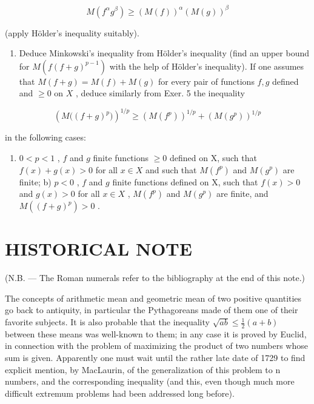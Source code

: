 \[
M (f ^ {\alpha} g ^ {\beta}) \geqslant (M (f)) ^ {\alpha} (M (g)) ^ {\beta}
\]

(apply Hölder's inequality suitably).

\begin{enumerate}
\def\labelenumi{\arabic{enumi})}
\setcounter{enumi}{5}
\tightlist
\item
  Deduce Minkowski's inequality from Hölder's inequality (find an upper bound for \(M(f(f + g)^{p-1})\) with the help of Hölder's inequality). If one assumes that \(M(f + g) = M(f) + M(g)\) for every pair of functions \(f, g\) defined and \(\geqslant 0\) on \(X\) , deduce similarly from Exer. 5 the inequality
\end{enumerate}

\[
\left(M \big ((f + g) ^ {p} \big)\right) ^ {1 / p} \geqslant \left(M (f ^ {p})\right) ^ {1 / p} + \left(M (g ^ {p})\right) ^ {1 / p}
\]

in the following cases:

\begin{enumerate}
\def\labelenumi{\alph{enumi})}
\tightlist
\item
  \(0 < p < 1\) , \(f\) and \(g\) finite functions \(\geqslant 0\) defined on X, such that \(f(x) + g(x) > 0\) for all \(x \in X\) and such that \(M(f^p)\) and \(M(g^p)\) are finite; b) \(p < 0\) , \(f\) and \(g\) finite functions defined on X, such that \(f(x) > 0\) and \(g(x) > 0\) for all \(x \in X\) , \(M(f^p)\) and \(M(g^p)\) are finite, and \(M((f + g)^p) > 0\) .
\end{enumerate}

\chapter*{HISTORICAL NOTE}
{}

(N.B. --- The Roman numerals refer to the bibliography at the end of this note.)

The concepts of arithmetic mean and geometric mean of two positive quantities go back to antiquity, in particular the Pythagoreans made of them one of their favorite subjects. It is also probable that the inequality \(\sqrt{ab} \leqslant \frac{1}{2}(a + b)\) between these means was well-known to them; in any case it is proved by Euclid, in connection with the problem of maximizing the product of two numbers whose sum is given. Apparently one must wait until the rather late date of 1729 to find explicit mention, by MacLaurin, of the generalization of this problem to n numbers, and the corresponding inequality (and this, even though much more difficult extremum problems had been addressed long before).

